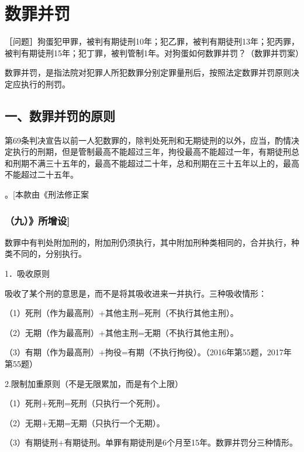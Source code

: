 \section{数罪并罚}

［问题］狗蛋犯甲罪，被判有期徒刑10年；犯乙罪，被判有期徒刑13年；犯丙罪，被判有期徒刑15年；犯丁罪，被判管制1年。对狗蛋如何数罪并罚？（数罪并罚案）

数罪并罚，是指法院对犯罪人所犯数罪分别定罪量刑后，按照法定数罪并罚原则决定应执行的刑罚。

\subsection*{一、数罪并罚的原则}

第69条判决宣告以前一人犯数罪的，除判处死刑和无期徒刑的以外，应当，酌情决定执行的刑期，但是管制最高不能超过三年，拘役最高不能超过一年，有期徒刑总和刑期不满三十五年的，最高不能超过二十年，总和刑期在三十五年以上的，最高不能超过二十五年。

。[本款由《刑法修正案

\subsubsection*{（九）》所增设]}

数罪中有判处附加刑的，附加刑仍须执行，其中附加刑种类相同的，合并执行，种类不同的，分别执行。

1．吸收原则

吸收了某个刑的意思是，而不是将其吸收进来一并执行。三种吸收情形：

（1）死刑（作为最高刑）+其他主刑=死刑（不执行其他主刑）。

（2）无期（作为最高刑）+其他主刑=无期（不执行其他主刑）。

（3）有期（作为最高刑）+拘役=有期（不执行拘役）。（2016年第55题，2017年第55题）

2.限制加重原则（不是无限累加，而是有个上限）

（1）死刑+死刑=死刑（只执行一个死刑）。

（2）无期+无期=无期（只执行一个无期）。

（3）有期徒刑+有期徒刑。单罪有期徒刑是6个月至15年。数罪并罚分三种情形。

